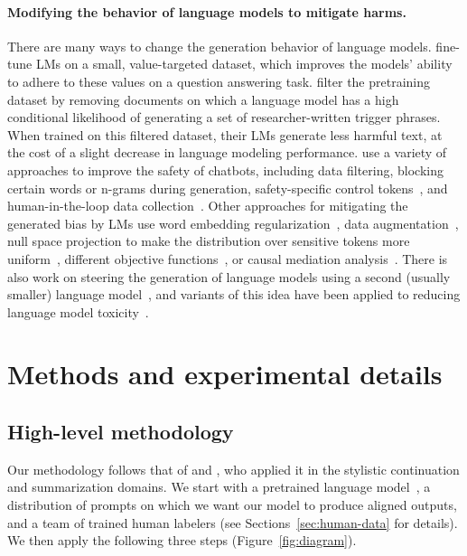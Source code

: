 \documentclass{article}
\begin{document}
\paragraph{Modifying the behavior of language models to mitigate harms.} There are many ways to change the generation behavior of language models. \citet{solaiman2021process} fine-tune LMs on a small, value-targeted dataset, which improves the models' ability to adhere to these values on a question answering task. \citet{ngo2021mitigating} filter the pretraining dataset by removing documents on which a language model has a high conditional likelihood of generating a set of researcher-written trigger phrases. When trained on this filtered dataset, their LMs generate less harmful text, at the cost of a slight decrease in language modeling performance. \citet{xu2020recipes} use a variety of approaches to improve the safety of chatbots, including data filtering, blocking certain words or n-grams during generation, safety-specific control tokens~\citep{keskar2019ctrl,dinan2019queens}, and human-in-the-loop data collection~\citep{dinan2019build}. Other approaches for mitigating the generated bias by LMs use word embedding regularization~\citep{liu2019does,huang2019reducing}, data augmentation~\citep{liu2019does,dinan2019queens,sheng2019woman}, null space projection to make the distribution over sensitive tokens more uniform~\citep{liang2021towards}, different objective functions~\citep{qian2019reducing}, or causal mediation analysis~\citep{vig2020investigating}. There is also work on steering the generation of language models using a second (usually smaller) language model~\citep{dathathri2019plug,krause2020gedi}, and variants of this idea have been applied to reducing language model toxicity~\citep{schick2021self}. 


\section{Methods and experimental details}
\label{sec:method}

\subsection{High-level methodology}
\label{sec:high-level-method}

Our methodology follows that of \citet{ziegler2019fine} and \citet{stiennon2020learning}, who applied it in the stylistic continuation and summarization domains. We start with a pretrained language model~\citep{radford2019language,brown2020language,fedus2021switch,rae2021scaling,thoppilan2022lamda}, a distribution of prompts on which we want our model to produce aligned outputs, and a team of trained human labelers (see Sections~\ref{sec:human-data} for details). We then apply the following three steps (Figure~\ref{fig:diagram}).
\end{document}
